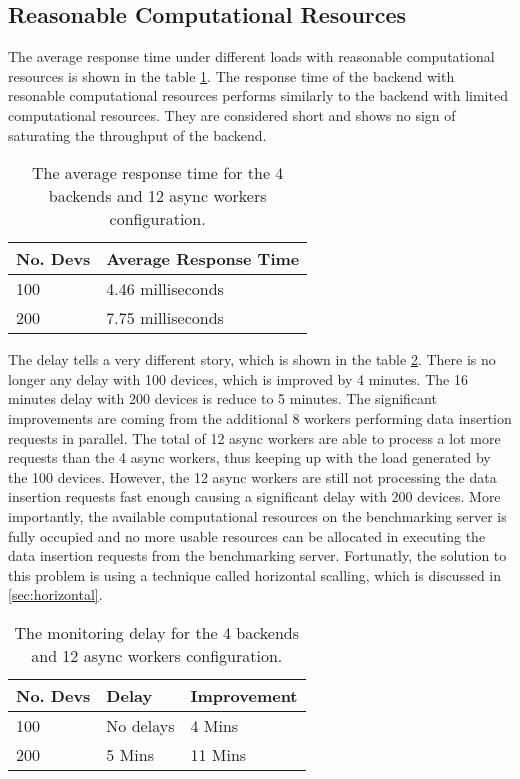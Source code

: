 \documentclass[../thesis.tex]{subfiles}
\begin{document}
\subsection{Reasonable Computational Resources}
\label{sec:reasonable}
The average response time under different loads with reasonable computational resources is shown in the table \ref{tab:avg4-12}. The response time of the backend with resonable computational resources performs similarly to the backend with limited computational resources. They are considered short and shows no sign of saturating the throughput of the backend. 

\begin{table}[h!]
	\begin{center}
		\caption{The average response time for the 4 backends and 12 async workers configuration.}
		\label{tab:avg4-12}
		\begin{tabular}{l|l}
			\toprule
			\textbf{No. Devs} & \textbf{Average Response Time}\\
			\midrule
			100 & 4.46 milliseconds\\
			200 & 7.75 milliseconds\\
			\bottomrule
		\end{tabular}
	\end{center}
\end{table}

The delay tells a very different story, which is shown in the table \ref{tab:delay4-12}. There is no longer any delay with 100 devices, which is improved by 4 minutes. The 16 minutes delay with 200 devices is reduce to 5 minutes. The significant improvements are coming from the additional 8 workers performing data insertion requests in parallel. The total of 12 async workers are able to process a lot more requests than the 4 async workers, thus keeping up with the load generated by the 100 devices. However, the 12 async workers are still not processing the data insertion requests fast enough causing a significant delay with 200 devices. More importantly, the available computational resources on the benchmarking server is fully occupied and no more usable resources can be allocated in executing the data insertion requests from the benchmarking server. Fortunatly, the solution to this problem is using a technique called horizontal scalling, which is discussed in \autoref{sec:horizontal}. 

\begin{table}[h!]
	\begin{center}
		\caption{The monitoring delay for the 4 backends and 12 async workers configuration.}
		\label{tab:delay4-12}
		\begin{tabular}{l|l|l}
			\toprule
			\textbf{No. Devs} & \textbf{Delay} & \textbf{Improvement}\\
			\midrule
			100 & No delays & 4 Mins	\\
			200 & 5 Mins & 11 Mins\\
			\bottomrule
		\end{tabular}
	\end{center}
\end{table}
\end{document}
